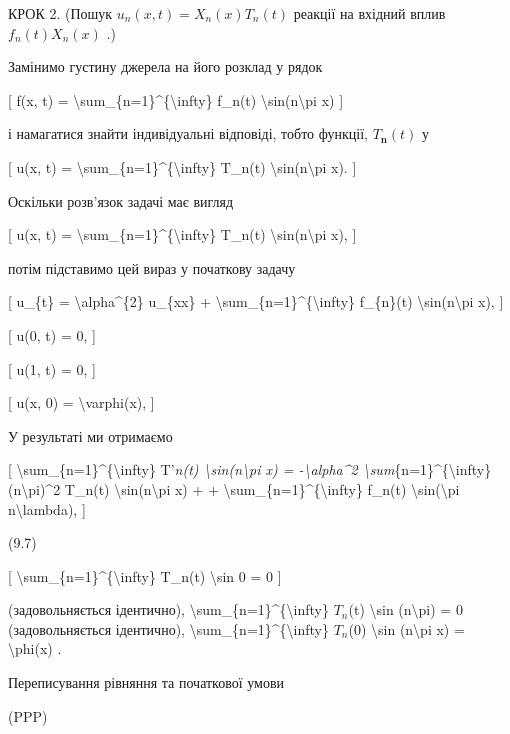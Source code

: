 \documentclass[
]{article}
\begin{document}
КРОК 2. (Пошук \(u_n(x, t) = X_n(x) T_n(t)\) реакції на вхідний вплив
\(f_n(t) X_n(x)\) .)

Замінимо густину джерела на його розклад у рядок

{[} f(x, t) = \textbackslash sum\_\{n=1\}\^{}\{\textbackslash infty\}
f\_n(t) \textbackslash sin(n\textbackslash pi x) {]}

і намагатися знайти індивідуальні відповіді, тобто функції,
\(T_{\mathbf{n}}(t)\) у

{[} u(x, t) = \textbackslash sum\_\{n=1\}\^{}\{\textbackslash infty\}
T\_n(t) \textbackslash sin(n\textbackslash pi x). {]}

Оскільки розв'язок задачі має вигляд

{[} u(x, t) = \textbackslash sum\_\{n=1\}\^{}\{\textbackslash infty\}
T\_n(t) \textbackslash sin(n\textbackslash pi x), {]}

потім підставимо цей вираз у початкову задачу

{[} u\_\{t\} = \textbackslash alpha\^{}\{2\} u\_\{xx\} +
\textbackslash sum\_\{n=1\}\^{}\{\textbackslash infty\} f\_\{n\}(t)
\textbackslash sin(n\textbackslash pi x), {]}

{[} u(0, t) = 0, {]}

{[} u(1, t) = 0, {]}

{[} u(x, 0) = \textbackslash varphi(x), {]}

У результаті ми отримаємо

{[} \textbackslash sum\_\{n=1\}\^{}\{\textbackslash infty\} T'\emph{n(t)
\textbackslash sin(n\textbackslash pi x) = -\textbackslash alpha\^{}2
\textbackslash sum}\{n=1\}\^{}\{\textbackslash infty\}
(n\textbackslash pi)\^{}2 T\_n(t) \textbackslash sin(n\textbackslash pi
x) + + \textbackslash sum\_\{n=1\}\^{}\{\textbackslash infty\} f\_n(t)
\textbackslash sin(\textbackslash pi n\textbackslash lambda), {]}

(9.7)

{[} \textbackslash sum\_\{n=1\}\^{}\{\textbackslash infty\} T\_n(t)
\textbackslash sin 0 = 0 {]}

(задовольняється ідентично),
\textbackslash sum\_\{n=1\}\^{}\{\textbackslash infty\} \(T_n\)(t)
\textbackslash sin (n\textbackslash pi) = 0 (задовольняється ідентично),
\textbackslash sum\_\{n=1\}\^{}\{\textbackslash infty\} \(T_n\)(0)
\textbackslash sin (n\textbackslash pi x) = \textbackslash phi(x) .

Переписування рівняння та початкової умови

(PPP)
\end{document}
